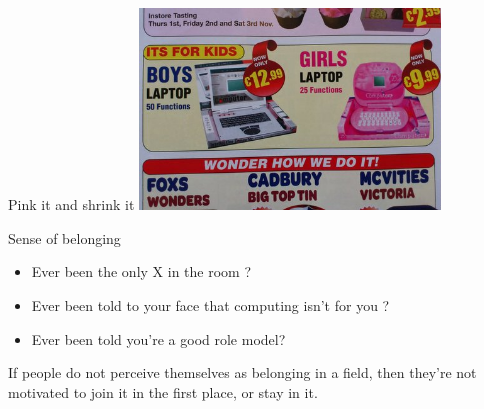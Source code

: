 \documentclass[xcolor=table,aspectratio=169]{beamer}
\begin{document}
\begin{frame}{Pink it and shrink it}
	\includegraphics[width=8cm]{laptop_pink.jpg}
\end{frame}
\begin{frame}{Sense of belonging }
	\begin{itemize}
		\item Ever been the only X in the room ?
			\pause
		\item Ever been told to your face that computing isn't for you ?
			\pause
		\item Ever been told you're a good role model?
	\end{itemize}
			\pause
If people do not perceive themselves as belonging in a field, then they're not motivated to join it in the first place, or stay in it. 

\end{frame}
\end{document}
